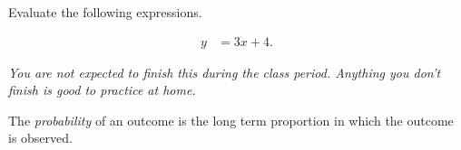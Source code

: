 


\begin{problem}
\item Evaluate the following expressions.

  \begin{subproblem}
  \item 
    \begin{eqnarray}
      y & = 3x + 4.
    \end{eqnarray}
    \vfill
  \end{subproblem}


\end{problem}



\textit{You are not expected to finish this during the class
  period. Anything you don't finish is good to practice at home.}


\begin{definition}
  The \textit{probability} of an outcome is the long term proportion
  in which the outcome is observed.
\end{definition}


